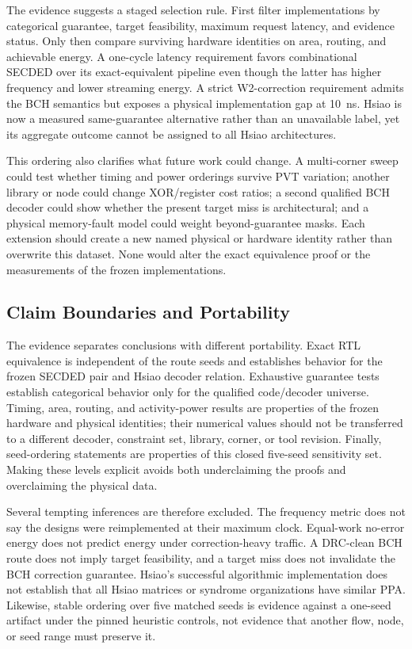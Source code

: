 The evidence suggests a staged selection rule. First filter implementations by categorical guarantee, target feasibility, maximum request latency, and evidence status. Only then compare surviving hardware identities on area, routing, and achievable energy. A one-cycle latency requirement favors combinational SECDED over its exact-equivalent pipeline even though the latter has higher frequency and lower streaming energy. A strict W2-correction requirement admits the BCH semantics but exposes a physical implementation gap at 10~ns. Hsiao is now a measured same-guarantee alternative rather than an unavailable label, yet its aggregate outcome cannot be assigned to all Hsiao architectures.

This ordering also clarifies what future work could change. A multi-corner sweep could test whether timing and power orderings survive PVT variation; another library or node could change XOR/register cost ratios; a second qualified BCH decoder could show whether the present target miss is architectural; and a physical memory-fault model could weight beyond-guarantee masks. Each extension should create a new named physical or hardware identity rather than overwrite this dataset. None would alter the exact equivalence proof or the measurements of the frozen implementations.

\subsection{Claim Boundaries and Portability}

The evidence separates conclusions with different portability. Exact RTL equivalence is independent of the route seeds and establishes behavior for the frozen SECDED pair and Hsiao decoder relation. Exhaustive guarantee tests establish categorical behavior only for the qualified code/decoder universe. Timing, area, routing, and activity-power results are properties of the frozen hardware and physical identities; their numerical values should not be transferred to a different decoder, constraint set, library, corner, or tool revision. Finally, seed-ordering statements are properties of this closed five-seed sensitivity set. Making these levels explicit avoids both underclaiming the proofs and overclaiming the physical data.

Several tempting inferences are therefore excluded. The frequency metric does not say the designs were reimplemented at their maximum clock. Equal-work no-error energy does not predict energy under correction-heavy traffic. A DRC-clean BCH route does not imply target feasibility, and a target miss does not invalidate the BCH correction guarantee. Hsiao's successful algorithmic implementation does not establish that all Hsiao matrices or syndrome organizations have similar PPA. Likewise, stable ordering over five matched seeds is evidence against a one-seed artifact under the pinned heuristic controls, not evidence that another flow, node, or seed range must preserve it.

